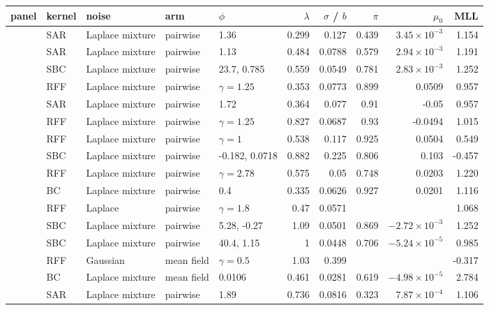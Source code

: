 \begin{tabular}{lllllrrrrr}
\toprule
panel & kernel & noise & arm & $\phi$ & $\lambda$ & $\sigma$ / $b$ & $\pi$ & $\mu_0$ & MLL \\
\midrule
\adamsLo{} & SAR & Laplace mixture & pairwise & 1.36 & 0.299 & 0.127 & 0.439 & $3.45\times10^{-3}$ & 1.154 \\
\adamsMid{} & SAR & Laplace mixture & pairwise & 1.13 & 0.484 & 0.0788 & 0.579 & $2.94\times10^{-3}$ & 1.191 \\
\adamsHi{} & SBC & Laplace mixture & pairwise & 23.7, 0.785 & 0.559 & 0.0549 & 0.781 & $2.83\times10^{-3}$ & 1.252 \\
\takacsCtl{} & RFF & Laplace mixture & pairwise & $\gamma=1.25$ & 0.353 & 0.0773 & 0.899 & 0.0509 & 0.957 \\
\takacsDis{} & SAR & Laplace mixture & pairwise & 1.72 & 0.364 & 0.077 & 0.91 & -0.05 & 0.957 \\
\takacsInt{} & RFF & Laplace mixture & pairwise & $\gamma=1.25$ & 0.827 & 0.0687 & 0.93 & -0.0494 & 1.015 \\
\takacsOne{} & RFF & Laplace mixture & pairwise & $\gamma=1$ & 0.538 & 0.117 & 0.925 & 0.0504 & 0.549 \\
\becker{} & SBC & Laplace mixture & pairwise & -0.182, 0.0718 & 0.882 & 0.225 & 0.806 & 0.103 & -0.457 \\
\vkg{} & RFF & Laplace mixture & pairwise & $\gamma=2.78$ & 0.575 & 0.05 & 0.748 & 0.0203 & 1.220 \\
\vkc{} & BC & Laplace mixture & pairwise & 0.4 & 0.335 & 0.0626 & 0.927 & 0.0201 & 1.116 \\
\senate{} & RFF & Laplace & pairwise & $\gamma=1.8$ & 0.47 & 0.0571 &  &  & 1.068 \\
\house{} & SBC & Laplace mixture & pairwise & 5.28, -0.27 & 1.09 & 0.0501 & 0.869 & $-2.72\times10^{-3}$ & 1.252 \\
\cmv{} & SBC & Laplace mixture & pairwise & 40.4, 1.15 & 1 & 0.0448 & 0.706 & $-5.24\times10^{-5}$ & 0.985 \\
\spinos{} & RFF & Gaussian & mean field & $\gamma=0.5$ & 1.03 & 0.399 &  &  & -0.317 \\
\kozitsin{} & BC & Laplace mixture & mean field & 0.0106 & 0.461 & 0.0281 & 0.619 & $-4.98\times10^{-5}$ & 2.784 \\
\markets{} & SAR & Laplace mixture & pairwise & 1.89 & 0.736 & 0.0816 & 0.323 & $7.87\times10^{-4}$ & 1.106 \\
\bottomrule
\end{tabular}
